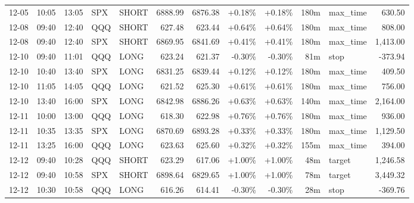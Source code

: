 \documentclass[11pt,a4paper,twoside]{article}
\begin{document}
\begin{center}
\begin{longtable}{>{\color{txtmain}}l l l l l r r r r r >{\color{txtmain}}l r}
12-05 & 10:05 & 13:05 & SPX & SHORT & 6888.99 & 6876.38 & \textcolor{wingreen}{+0.18\%} & \textcolor{wingreen}{+0.18\%} & 180m & max\_time & \textcolor{wingreen}{630.50} \\
12-08 & 09:40 & 12:40 & QQQ & SHORT & 627.48 & 623.44 & \textcolor{wingreen}{+0.64\%} & \textcolor{wingreen}{+0.64\%} & 180m & max\_time & \textcolor{wingreen}{808.00} \\
12-08 & 09:40 & 12:40 & SPX & SHORT & 6869.95 & 6841.69 & \textcolor{wingreen}{+0.41\%} & \textcolor{wingreen}{+0.41\%} & 180m & max\_time & \textcolor{wingreen}{1,413.00} \\
12-10 & 09:40 & 11:01 & QQQ & LONG & 623.24 & 621.37 & \textcolor{lossred}{-0.30\%} & \textcolor{lossred}{-0.30\%} & 81m & stop & \textcolor{lossred}{-373.94} \\
12-10 & 10:40 & 13:40 & SPX & LONG & 6831.25 & 6839.44 & \textcolor{wingreen}{+0.12\%} & \textcolor{wingreen}{+0.12\%} & 180m & max\_time & \textcolor{wingreen}{409.50} \\
12-10 & 11:05 & 14:05 & QQQ & LONG & 621.52 & 625.30 & \textcolor{wingreen}{+0.61\%} & \textcolor{wingreen}{+0.61\%} & 180m & max\_time & \textcolor{wingreen}{756.00} \\
12-10 & 13:40 & 16:00 & SPX & LONG & 6842.98 & 6886.26 & \textcolor{wingreen}{+0.63\%} & \textcolor{wingreen}{+0.63\%} & 140m & max\_time & \textcolor{wingreen}{2,164.00} \\
12-11 & 10:00 & 13:00 & QQQ & LONG & 618.30 & 622.98 & \textcolor{wingreen}{+0.76\%} & \textcolor{wingreen}{+0.76\%} & 180m & max\_time & \textcolor{wingreen}{936.00} \\
12-11 & 10:35 & 13:35 & SPX & LONG & 6870.69 & 6893.28 & \textcolor{wingreen}{+0.33\%} & \textcolor{wingreen}{+0.33\%} & 180m & max\_time & \textcolor{wingreen}{1,129.50} \\
12-11 & 13:25 & 16:00 & QQQ & LONG & 623.63 & 625.60 & \textcolor{wingreen}{+0.32\%} & \textcolor{wingreen}{+0.32\%} & 155m & max\_time & \textcolor{wingreen}{394.00} \\
12-12 & 09:40 & 10:28 & QQQ & SHORT & 623.29 & 617.06 & \textcolor{wingreen}{+1.00\%} & \textcolor{wingreen}{+1.00\%} & 48m & target & \textcolor{wingreen}{1,246.58} \\
12-12 & 09:40 & 10:58 & SPX & SHORT & 6898.64 & 6829.65 & \textcolor{wingreen}{+1.00\%} & \textcolor{wingreen}{+1.00\%} & 78m & target & \textcolor{wingreen}{3,449.32} \\
12-12 & 10:30 & 10:58 & QQQ & LONG & 616.26 & 614.41 & \textcolor{lossred}{-0.30\%} & \textcolor{lossred}{-0.30\%} & 28m & stop & \textcolor{lossred}{-369.76} \\

\end{longtable}
\end{center}
\end{document}
